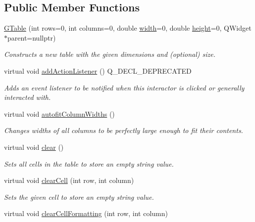 \subsection*{Public Member Functions}
\begin{DoxyCompactItemize}
\item 
\mbox{\hyperlink{classGTable_a5ceea9546881f429ad4601366908848d}{G\+Table}} (int rows=0, int columns=0, double \mbox{\hyperlink{classGTable_ad72663daf610f2a0833a2fc3d78e4fdf}{width}}=0, double \mbox{\hyperlink{classGTable_ad3774f6419003470f54fd495124ef51f}{height}}=0, Q\+Widget $\ast$parent=nullptr)
\begin{DoxyCompactList}\small\item\em Constructs a new table with the given dimensions and (optional) size. \end{DoxyCompactList}\item 
virtual void \mbox{\hyperlink{classGInteractor_a02f20ea6edfa0671f31c4c648a253833}{add\+Action\+Listener}} () Q\+\_\+\+D\+E\+C\+L\+\_\+\+D\+E\+P\+R\+E\+C\+A\+T\+ED
\begin{DoxyCompactList}\small\item\em Adds an event listener to be notified when this interactor is clicked or generally interacted with. \end{DoxyCompactList}\item 
virtual void \mbox{\hyperlink{classGTable_afaf36ccb6a75432b5f5463613ef01ef4}{autofit\+Column\+Widths}} ()
\begin{DoxyCompactList}\small\item\em Changes widths of all columns to be perfectly large enough to fit their contents. \end{DoxyCompactList}\item 
virtual void \mbox{\hyperlink{classGTable_ac8bb3912a3ce86b15842e79d0b421204}{clear}} ()
\begin{DoxyCompactList}\small\item\em Sets all cells in the table to store an empty string value. \end{DoxyCompactList}\item 
virtual void \mbox{\hyperlink{classGTable_ab7bffbf52806e438ac155886079d9bf6}{clear\+Cell}} (int row, int column)
\begin{DoxyCompactList}\small\item\em Sets the given cell to store an empty string value. \end{DoxyCompactList}\item 
virtual void \mbox{\hyperlink{classGTable_a5ba4fe558e9d315c123ecd9e896065ca}{clear\+Cell\+Formatting}} (int row, int column)

\end{DoxyCompactItemize}
